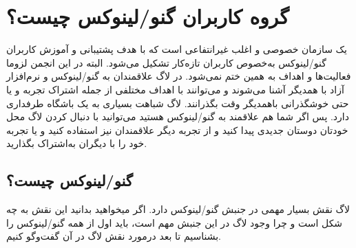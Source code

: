 \section{گروه کاربران گنو/لینوکس چیست؟}
یک سازمان خصوصی و اغلب غیرانتفاعی است که با هدف پشتیبانی و آموزش کاربران گنو/لینوکس
به‌خصوص کاربران تازه‌کار تشکیل می‌شود. البته در این انجمن لزوما فعالیت‌ها و اهداف به همین ختم نمی‌شود.
در لاگ علاقمندان به گنو/لینوکس و نرم‌افزار آزاد با همدیگر آشنا می‌شوند و می‌توانند با اهداف مختلفی از جمله
اشتراک تجربه و یا حتی خوشگذرانی باهمدیگر وقت بگذرانند. لاگ شباهت بسیاری به یک باشگاه طرفداری دارد.
پس اگر شما هم علاقمند به گنو/لینوکس هستید می‌توانید با دنبال کردن لاگ محل خودتان دوستان جدیدی
پیدا کنید و از تجربه دیگر علاقمندان نیز استفاده کنید و یا تجربه خود را با دیگران به‌اشتراک بگذارید.

\subsection{گنو/لینوکس چیست؟}
لاگ نقش بسیار مهمی در جنبش گنو/لینوکس دارد. اگر میخواهید بدانید این نقش به چه شکل است
و چرا وجود لاگ در این جنبش مهم است، باید اول از همه گنو/لینوکس را بشناسیم تا بعد درمورد
نقش لاگ در آن گفت‌وگو کنیم.

